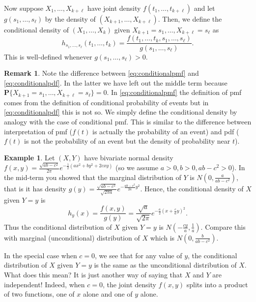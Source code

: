 \documentclass[preprint,  11pt]{amsart}
\newcommand{\parag}[1]{\vspace{4mm}\noindent{\bfseries #1}}
\theoremstyle{plain} %
\theoremstyle{definition} %
\newtheorem{remark}[theorem]{Remark}
\newtheorem{example}[theorem]{Example}
\begin{document}
{\parag{Conditional densities} Now suppose $X_{1},\ldots ,X_{k+\ell}$ have joint density $f(t_{1},\ldots ,t_{k+\ell})$ and let $g(s_{1},\ldots ,s_{\ell})$ by the density of $(X_{k+1},\ldots ,X_{k+\ell})$. Then, we define the conditional density of $(X_{1},\ldots ,X_{k})$ given $X_{k+1}=s_{1},\ldots ,X_{k+\ell}=s_{\ell}$ as
\begin{equation}\label{eq:conditionalpdf}
h_{s_{1},\ldots ,s_{\ell}}(t_{1},\ldots,t_{k})=\frac{f(t_{1},\ldots ,t_{k},s_{1},\ldots ,s_{\ell})}{g(s_{1},\ldots ,s_{\ell})}.
\end{equation}
This is well-defined whenever $g(s_{1},\ldots ,s_{\ell})>0$.

\begin{remark} Note the difference between \eqref{eq:conditionalpmf} and \eqref{eq:conditionalpdf}. In the latter we have left out the middle term because $\mathbf{P}\{X_{k+1}=s_{1},\ldots ,X_{k+\ell}=s_{\ell}\}=0$. In \eqref{eq:conditionalpmf} the definition of pmf comes from the definition of conditional probability of events but in \eqref{eq:conditionalpdf} this is not so. We simply define the conditional density by analogy with the case of conditional pmf.  This is similar to the difference between interpretation of pmf ($f(t)$ is actually the probability of an event) and pdf ($f(t)$ is not the probability of an event but the density of probability near $t$).
\end{remark}

\begin{example} Let $(X,Y)$ have bivariate normal density $f(x,y)=\frac{\sqrt{ab-c^{2}}}{2\pi}e^{-\frac{1}{2}(ax^{2}+by^{2}+2cxy)}$ (so we assume $a>0,b>0, ab-c^{2}>0$). In the mid-term you showed that the marginal distribution of $Y$ is $N(0,\frac{a}{ab-c^{2}})$, that is it has density $g(y)=\frac{\sqrt{ab-c^{2}}}{\sqrt{2\pi a}}e^{-\frac{ab-c^{2}}{2a}y^{2}}$. Hence, the conditional density of $X$ given $Y=y$ is 
$$
h_{y}(x)=\frac{f(x,y)}{g(y)} =\frac{\sqrt{a}}{\sqrt{2\pi}}e^{-\frac{a}{2}(x+\frac{c}{a}y)^{2}}.
$$
Thus the conditional distribution of $X$ given $Y=y$ is $N(-\frac{cy}{a},\frac{1}{a})$. Compare this with marginal (unconditional) distribution of $X$ which is $N(0,\frac{b}{ab-c^{2}})$. 

In the special case when $c=0$, we see that for any value of $y$, the conditional distribution of $X$ given $Y=y$ is the same as the unconditional distribution of $X$. What does this mean? It is just another way of saying that $X$ and $Y$ are independent! Indeed, when $c=0$, the joint density $f(x,y)$ splits into a product of two functions, one of $x$ alone and one of $y$ alone.
\end{example}

}
\end{document}
